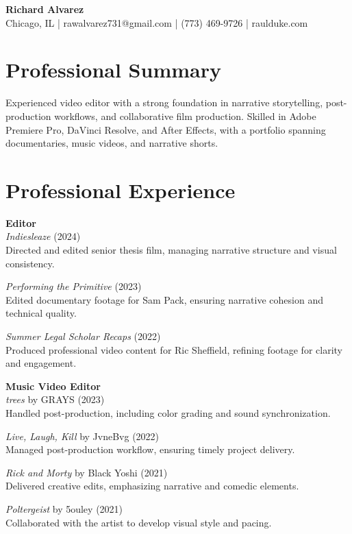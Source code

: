 \documentclass[letterpaper,11pt]{article}
\begin{document}
\begin{center}
    {\LARGE \textbf{Richard Alvarez}}\\[0.8em]
    Chicago, IL | rawalvarez731@gmail.com | (773) 469-9726 | raulduke.com
\end{center}

\section*{Professional Summary}
Experienced video editor with a strong foundation in narrative storytelling, post-production workflows, and collaborative film production. Skilled in Adobe Premiere Pro, DaVinci Resolve, and After Effects, with a portfolio spanning documentaries, music videos, and narrative shorts.

\section*{Professional Experience}

\textbf{Editor} \\
\textit{Indiesleaze} (2024) \\
Directed and edited senior thesis film, managing narrative structure and visual consistency.

\textit{Performing the Primitive} (2023) \\
Edited documentary footage for Sam Pack, ensuring narrative cohesion and technical quality.

\textit{Summer Legal Scholar Recaps} (2022) \\
Produced professional video content for Ric Sheffield, refining footage for clarity and engagement.

\vspace{0.5em} %

\textbf{Music Video Editor} \\
\textit{trees} by GRAYS (2023) \\
Handled post-production, including color grading and sound synchronization.

\textit{Live, Laugh, Kill} by JvneBvg (2022) \\
Managed post-production workflow, ensuring timely project delivery.

\textit{Rick and Morty} by Black Yoshi (2021) \\
Delivered creative edits, emphasizing narrative and comedic elements.

\textit{Poltergeist} by 5ouley (2021) \\
Collaborated with the artist to develop visual style and pacing.
\end{document}
